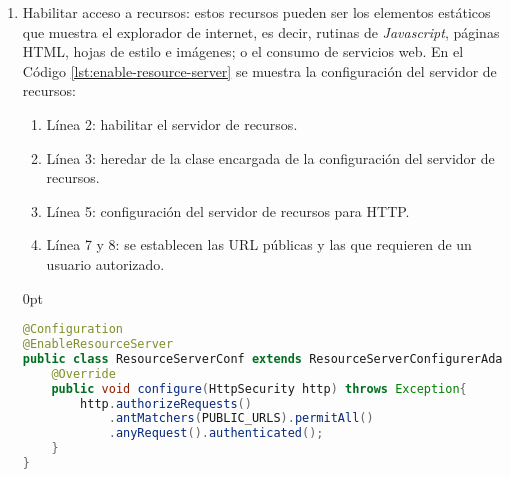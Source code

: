 \begin{enumerate}
\begin{adjustwidth}{\listingfixwidth}{0pt}
\begin{lstlisting}[language=Java, caption={Derivación de la constraseña de usuario.}, captionpos=b, label={lst:kdf}]
public byte[] derivate(char[] password, byte[] salt) throws NoSuchAlgorithmException, InvalidKeySpecException{
	PBEKeySpec spec = new PBEKeySpec(password, salt, it, length);
	SecretKeyFactory skf = SecretKeyFactory.getInstance(algorithm);
	return skf.generateSecret(spec).getEncoded();
}
\end{lstlisting}
\end{adjustwidth}

	\item Habilitar acceso a recursos: estos recursos pueden ser los elementos estáticos que muestra el explorador de internet, es decir, rutinas de \textit{Javascript}, páginas HTML, hojas de estilo e imágenes; o el consumo de servicios web. En el Código \ref{lst:enable-resource-server} se muestra la configuración del servidor de recursos:

	\begin{enumerate}
		\item Línea 2: habilitar el servidor de recursos.
		\item Línea 3: heredar de la clase encargada de la configuración del servidor de recursos.
		\item Línea 5: configuración del servidor de recursos para HTTP.
		\item Línea 7 y 8: se establecen las URL públicas y las que requieren de un usuario autorizado.
	\end{enumerate}

\begin{adjustwidth}{\listingfixwidth}{0pt}
\begin{lstlisting}[language=Java, caption={Clase de configuración de servidor de recursos.}, captionpos=b, label={lst:enable-resource-server}]
@Configuration
@EnableResourceServer
public class ResourceServerConf extends ResourceServerConfigurerAdapter{
	@Override
	public void configure(HttpSecurity http) throws Exception{
		http.authorizeRequests()
			.antMatchers(PUBLIC_URLS).permitAll()
			.anyRequest().authenticated();
	}
}
\end{lstlisting}
\end{adjustwidth}
\end{enumerate}

